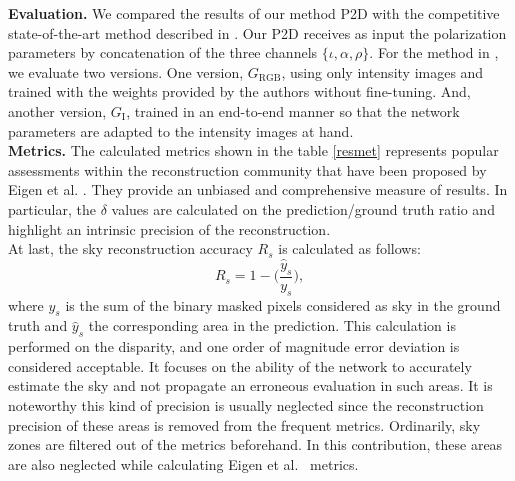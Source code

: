 \textbf{Evaluation.} We compared the results of our method P2D with the competitive state-of-the-art method described in \cite{godard2019digging}. Our P2D receives as input the polarization parameters by concatenation of the three channels $\{\iota, \alpha, \rho\}$. For the method in \cite{godard2019digging}, we evaluate two versions. One version, $G_{\textrm{RGB}}$, using only intensity images and trained with the weights provided by the authors without fine-tuning. And, another version, $G_{\textrm{I}}$, trained in an end-to-end manner so that the network parameters are adapted to the intensity images at hand.\\


\textbf{Metrics. }The calculated metrics shown in the table \ref{resmet} represents popular assessments within the reconstruction community that have been proposed by Eigen et al. \cite{eigen2014depth}. They provide an unbiased and comprehensive measure of results. In particular, the $\delta$ values are calculated on the prediction/ground truth ratio and highlight an intrinsic precision of the reconstruction.\\

At last, the sky reconstruction accuracy $R_s$ is calculated as follows:
\begin{equation}\label{reconSky}
R_s = 1 - \Big(\frac{\hat{y}_s}{y_s}\Big),
\end{equation}
where $y_s$ is the sum of the binary masked pixels considered as sky in the ground truth and $\hat{y}_s$ the corresponding area in the prediction. This calculation is performed on the disparity, and one order of magnitude error deviation is considered acceptable.
It focuses on the ability of the network to accurately estimate the sky and not propagate an erroneous evaluation in such areas. It is noteworthy this kind of precision is usually neglected since the reconstruction precision of these areas is removed from the frequent metrics. Ordinarily, sky zones are filtered out of the metrics beforehand. In this contribution, these areas are also neglected while calculating Eigen et al.~\cite{eigen2014depth} metrics.

